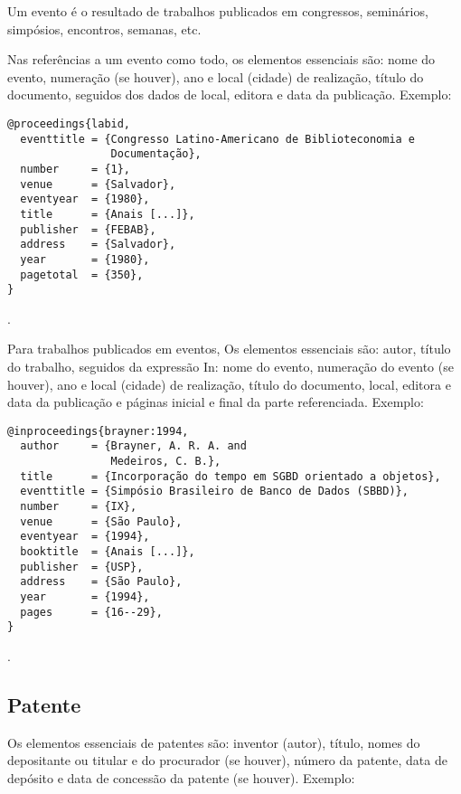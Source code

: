 Um evento é o resultado de trabalhos publicados em congressos, seminários, simpósios, encontros, semanas, etc.

Nas referências a um evento como todo, os elementos essenciais são: nome do evento, numeração (se houver), ano e local (cidade) de realização, título do documento, seguidos dos dados de local, editora e data da publicação.
Exemplo:

\vspace*{1em}


\begin{verbatim}
@proceedings{labid,
  eventtitle = {Congresso Latino-Americano de Biblioteconomia e
                Documentação},
  number     = {1},
  venue      = {Salvador},
  eventyear  = {1980},
  title      = {Anais [...]},
  publisher  = {FEBAB},
  address    = {Salvador},
  year       = {1980},
  pagetotal  = {350},
}
\end{verbatim}

\noindent
{}.

\vspace*{1em}

Para trabalhos publicados em eventos, Os elementos essenciais são: autor, título do trabalho, seguidos da expressão In: nome do evento, numeração do evento (se houver), ano e local (cidade) de realização, título do documento, local, editora e data da publicação e páginas inicial e final da parte referenciada.
Exemplo:

\vspace*{1em}

\begin{verbatim}
@inproceedings{brayner:1994,
  author     = {Brayner, A. R. A. and
                Medeiros, C. B.},
  title      = {Incorporação do tempo em SGBD orientado a objetos},
  eventtitle = {Simpósio Brasileiro de Banco de Dados (SBBD)},
  number     = {IX},
  venue      = {São Paulo},
  eventyear  = {1994},
  booktitle  = {Anais [...]},
  publisher  = {USP},
  address    = {São Paulo},
  year       = {1994},
  pages      = {16--29},
}
\end{verbatim}

\noindent
{}.

\subsection{Patente}

Os elementos essenciais de patentes são: inventor (autor), título, nomes do depositante ou titular e do procurador (se houver), número da patente, data de depósito e data de concessão da patente (se houver).
Exemplo:

